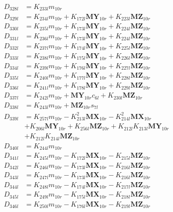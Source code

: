 \begin{multicols}{2}
\begin{align}
D_{328l} &= K_{233l}m_{10r} \nonumber \\
D_{329l} &= K_{234l}m_{10r} + K_{172l}\mathbf{MY}_{10r} + K_{223l}\mathbf{MZ}_{10r} \nonumber \\
D_{330l} &= K_{235l}m_{10r} + K_{173l}\mathbf{MY}_{10r} + K_{224l}\mathbf{MZ}_{10r} \nonumber \\
D_{331l} &= K_{236l}m_{10r} + K_{173l}\mathbf{MY}_{10r} + K_{224l}\mathbf{MZ}_{10r} \nonumber \\
D_{332l} &= K_{237l}m_{10r} + K_{174l}\mathbf{MY}_{10r} + K_{225l}\mathbf{MZ}_{10r} \nonumber \\
D_{333l} &= K_{238l}m_{10r} + K_{175l}\mathbf{MY}_{10r} + K_{226l}\mathbf{MZ}_{10r} \nonumber \\
D_{334l} &= K_{239l}m_{10r} + K_{176l}\mathbf{MY}_{10r} + K_{227l}\mathbf{MZ}_{10r} \nonumber \\
D_{335l} &= K_{240l}m_{10r} + K_{177l}\mathbf{MY}_{10r} + K_{228l}\mathbf{MZ}_{10r} \nonumber \\
D_{336l} &= K_{241l}m_{10r} + K_{178l}\mathbf{MY}_{10r} + K_{229l}\mathbf{MZ}_{10r} \nonumber \\
D_{337l} &= K_{242l}m_{10r} + \mathbf{MY}_{10r}c_{6l} + K_{230l}\mathbf{MZ}_{10r} \nonumber \\
D_{338l} &= K_{243l}m_{10r} + \mathbf{MZ}_{10r}s_{7l} \nonumber \\
D_{339l} &= K_{257l}m_{10r} - K_{213l}^2\mathbf{MX}_{10r} - K_{214l}^2\mathbf{MX}_{10r}  \nonumber \\
&+ K_{206l}\mathbf{MY}_{10r} + K_{256l}\mathbf{MZ}_{10r} + K_{212l}K_{213l}\mathbf{MY}_{10r}  \nonumber \\
&+ K_{212l}K_{214l}\mathbf{MZ}_{10r} \nonumber \\
D_{340l} &= K_{244l}m_{10r} \nonumber \\
D_{341l} &= K_{245l}m_{10r} - K_{172l}\mathbf{MX}_{10r} - K_{215l}\mathbf{MZ}_{10r} \nonumber \\
D_{342l} &= K_{246l}m_{10r} - K_{173l}\mathbf{MX}_{10r} - K_{216l}\mathbf{MZ}_{10r} \nonumber \\
D_{343l} &= K_{247l}m_{10r} - K_{173l}\mathbf{MX}_{10r} - K_{216l}\mathbf{MZ}_{10r} \nonumber \\
D_{344l} &= K_{248l}m_{10r} - K_{174l}\mathbf{MX}_{10r} - K_{217l}\mathbf{MZ}_{10r} \nonumber \\
D_{345l} &= K_{249l}m_{10r} - K_{175l}\mathbf{MX}_{10r} - K_{218l}\mathbf{MZ}_{10r} \nonumber \\
D_{346l} &= K_{250l}m_{10r} - K_{176l}\mathbf{MX}_{10r} - K_{219l}\mathbf{MZ}_{10r} \nonumber \\

\end{align}
\end{multicols}
